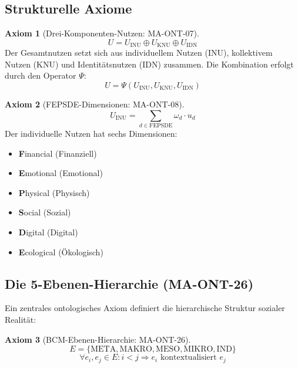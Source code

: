 \documentclass[11pt,a4paper]{article}
\theoremstyle{definition}
\newtheorem{axiom}{Axiom}[section]
\theoremstyle{plain}
\begin{document}
\subsection{Strukturelle Axiome}

\begin{axiom}[Drei-Komponenten-Nutzen: MA-ONT-07]
\begin{equation}
U = U_{\text{INU}} \oplus U_{\text{KNU}} \oplus U_{\text{IDN}}
\end{equation}
Der Gesamtnutzen setzt sich aus individuellem Nutzen (INU), kollektivem Nutzen (KNU) und Identitätsnutzen (IDN) zusammen. Die Kombination erfolgt durch den Operator $\Psi$:
\begin{equation}
U = \Psi(U_{\text{INU}}, U_{\text{KNU}}, U_{\text{IDN}})
\end{equation}
\end{axiom}

\begin{axiom}[FEPSDE-Dimensionen: MA-ONT-08]
\begin{equation}
U_{\text{INU}} = \sum_{d \in \text{FEPSDE}} \omega_d \cdot u_d
\end{equation}
Der individuelle Nutzen hat sechs Dimensionen:
\begin{itemize}
    \item \textbf{F}inancial (Finanziell)
    \item \textbf{E}motional (Emotional)
    \item \textbf{P}hysical (Physisch)
    \item \textbf{S}ocial (Sozial)
    \item \textbf{D}igital (Digital)
    \item \textbf{E}cological (Ökologisch)
\end{itemize}
\end{axiom}

\subsection{Die 5-Ebenen-Hierarchie (MA-ONT-26)}

Ein zentrales ontologisches Axiom definiert die hierarchische Struktur sozialer Realität:

\begin{axiom}[BCM-Ebenen-Hierarchie: MA-ONT-26]
\begin{equation}
E = \{\text{META}, \text{MAKRO}, \text{MESO}, \text{MIKRO}, \text{IND}\}
\end{equation}
\begin{equation}
\forall e_i, e_j \in E: i < j \Rightarrow e_i \text{ kontextualisiert } e_j
\end{equation}
\end{axiom}
\end{document}
